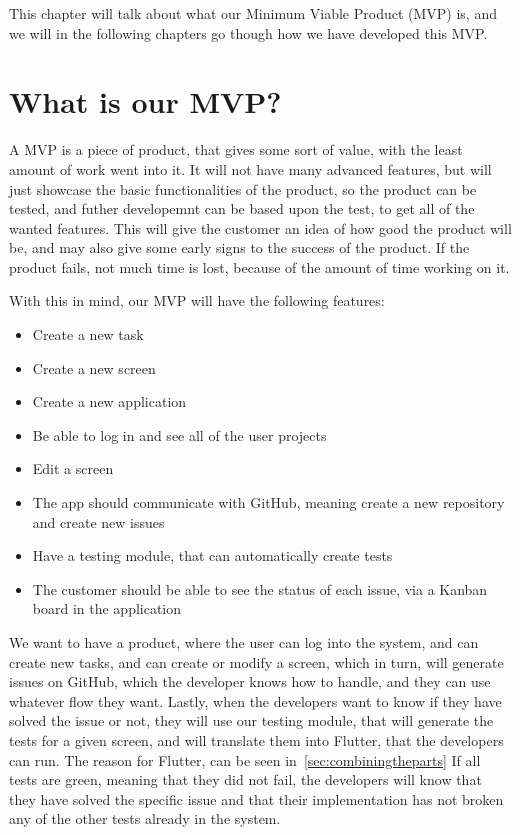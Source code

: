 This chapter will talk about what our Minimum Viable Product (MVP) is, and we will in the following chapters go though how we have developed this MVP.

\section{What is our MVP?}
A MVP is a piece of product, that gives some sort of value, with the least amount of work went into it.
It will not have many advanced features, but will just showcase the basic functionalities of the product, so the product can be tested, and futher developemnt can be based upon the test, to get all of the wanted features.
This will give the customer an idea of how good the product will be, and may also give some early signs to the success of the product. 
If the product fails, not much time is lost, because of the amount of time working on it. \cite{whatIsMVP}

With this in mind, our MVP will have the following features:

\begin{itemize}
    \item Create a new task
    \item Create a new screen
    \item Create a new application
    \item Be able to log in and see all of the user projects
    \item Edit a screen 
    \item The app should communicate with GitHub, meaning create a new repository and create new issues
    \item Have a testing module, that can automatically create tests
    \item The customer should be able to see the status of each issue, via a Kanban board in the application
\end{itemize}

We want to have a product, where the user can log into the system, and can create new tasks, and can create or modify a screen, which in turn, will generate issues on GitHub, which the developer knows how to handle, and they can use whatever flow they want.
Lastly, when the developers want to know if they have solved the issue or not, they will use our testing module, that will generate the tests for a given screen, and will translate them into Flutter, that the developers can run. The reason for Flutter, can be seen in~\autoref{sec:combiningtheparts} 
If all tests are green, meaning that they did not fail, the developers will know that they have solved the specific issue and that their implementation has not broken any of the other tests already in the system.
